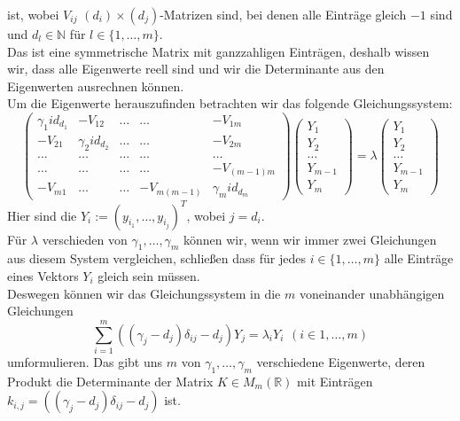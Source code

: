ist, wobei $V_{ij}$ $(d_i)\times(d_j)$-Matrizen sind, bei denen alle Einträge gleich $-1$ sind und $d_l\in\mathbb{N}$ für $l\in \{1,\ldots,m\}$.\\
Das ist eine symmetrische Matrix mit ganzzahligen Einträgen, deshalb wissen wir, dass alle Eigenwerte reell sind und wir die Determinante aus den Eigenwerten ausrechnen können.\\
Um die Eigenwerte herauszufinden betrachten wir das folgende Gleichungssystem:
\begin{equation}
\begin{pmatrix}
 {\gamma_1}id_{d_1}&-V_{12}&\ldots&\ldots&-V_{1m}\\
 -V_{21}&{\gamma_2}id_{d_2}&\ldots&\ldots&-V_{2m}\\
 \ldots&\ldots&\ldots&\ldots&\ldots\\
  \ldots&\ldots&\ldots&\ldots&-V_{(m-1)m}\\
 -V_{m1}&\ldots&\ldots&-V_{m(m-1)}&{\gamma_m}id_{d_m}
\end{pmatrix}
\begin{pmatrix}
 Y_1\\
 Y_2\\
 \ldots\\
 Y_{m-1}\\
 Y_m
\end{pmatrix}
 =\lambda
 \begin{pmatrix}
 Y_1\\
 Y_2\\
 \ldots\\
 Y_{m-1}\\
 Y_m
\end{pmatrix}
\end{equation}
Hier sind die $Y_i:=(y_{i_1},\ldots,y_{i_j})^T$, wobei $j=d_i$.\\
Für $\lambda$ verschieden von $\gamma_1,\ldots,\gamma_m$ können wir, wenn wir immer zwei Gleichungen aus diesem System vergleichen, schließen dass für jedes $i \in \{1,\ldots,m\}$ alle Einträge eines Vektors $Y_i$ gleich sein müssen.\\
Deswegen können wir das Gleichungssystem in die $m$ voneinander unabhängigen Gleichungen 
\begin{equation}
 \sum_{i=1}^m((\gamma_j-d_j)\delta_{ij}-d_j)Y_j=\lambda_iY_i
  \hspace{5pt}(i\in{1,\ldots,m})
\end{equation}
umformulieren.
Das gibt uns $m$  von $\gamma_1,\ldots,\gamma_m$ verschiedene Eigenwerte, deren Produkt die Determinante der Matrix $K \in M_m(\mathbb{R})$ mit Einträgen $k_{i,j}=((\gamma_j-d_j)\delta_{ij}-d_j)$ ist.\\
